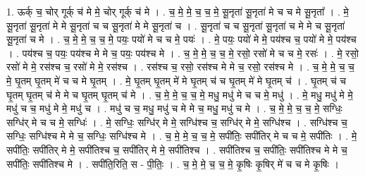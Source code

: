 \documentclass[17pt]{extarticle}
\begin{document}
1. ऊर्क् च॒ चोर् गूर्क् च॑ मे मे॒ चोर् गूर्क् च॑ मे । . च॒ मे॒ मे॒ च॒ च॒ मे॒ सू॒नृता॑ सू॒नृता॑ मे च च मे सू॒नृता᳚ । . मे॒ सू॒नृता॑ सू॒नृता॑ मे मे सू॒नृता॑ च च सू॒नृता॑ मे मे सू॒नृता॑ च । . सू॒नृता॑ च च सू॒नृता॑ सू॒नृता॑ च मे मे च सू॒नृता॑ सू॒नृता॑ च मे । . च॒ मे॒ मे॒ च॒ च॒ मे॒ पयः॒ पयो॑ मे च च मे॒ पयः॑ । . मे॒ पयः॒ पयो॑ मे मे॒ पय॑श्च च॒ पयो॑ मे मे॒ पय॑श्च । . पय॑श्च च॒ पयः॒ पय॑श्च मे मे च॒ पयः॒ पय॑श्च मे । . च॒ मे॒ मे॒ च॒ च॒ मे॒ रसो॒ रसो॑ मे च च मे॒ रसः॑ । . मे॒ रसो॒ रसो॑ मे मे॒ रस॑श्च च॒ रसो॑ मे मे॒ रस॑श्च । . रस॑श्च च॒ रसो॒ रस॑श्च मे मे च॒ रसो॒ रस॑श्च मे । . च॒ मे॒ मे॒ च॒ च॒ मे॒ घृ॒तम् घृ॒तम् मे॑ च च मे घृ॒तम् । . मे॒ घृ॒तम् घृ॒तम् मे॑ मे घृ॒तम् च॑ च घृ॒तम् मे॑ मे घृ॒तम् च॑ । . घृ॒तम् च॑ च घृ॒तम् घृ॒तम् च॑ मे मे च घृ॒तम् घृ॒तम् च॑ मे । . च॒ मे॒ मे॒ च॒ च॒ मे॒ मधु॒ मधु॑ मे च च मे॒ मधु॑ । . मे॒ मधु॒ मधु॑ मे मे॒ मधु॑ च च॒ मधु॑ मे मे॒ मधु॑ च । . मधु॑ च च॒ मधु॒ मधु॑ च मे मे च॒ मधु॒ मधु॑ च मे । . च॒ मे॒ मे॒ च॒ च॒ मे॒ सग्धिः॒ सग्धि॑र् मे च च मे॒ सग्धिः॑ । . मे॒ सग्धिः॒ सग्धि॑र् मे मे॒ सग्धि॑श्च च॒ सग्धि॑र् मे मे॒ सग्धि॑श्च । . सग्धि॑श्च च॒ सग्धिः॒ सग्धि॑श्च मे मे च॒ सग्धिः॒ सग्धि॑श्च मे । . च॒ मे॒ मे॒ च॒ च॒ मे॒ सपी॑तिः॒ सपी॑तिर् मे च च मे॒ सपी॑तिः । . मे॒ सपी॑तिः॒ सपी॑तिर् मे मे॒ सपी॑तिश्च च॒ सपी॑तिर् मे मे॒ सपी॑तिश्च । . सपी॑तिश्च च॒ सपी॑तिः॒ सपी॑तिश्च मे मे च॒ सपी॑तिः॒ सपी॑तिश्च मे । . सपी॑ति॒रिति॒ स - पी॒तिः॒ । . च॒ मे॒ मे॒ च॒ च॒ मे॒ कृ॒षिः कृ॒षिर् मे॑ च च मे कृ॒षिः । \newline
\end{document}
